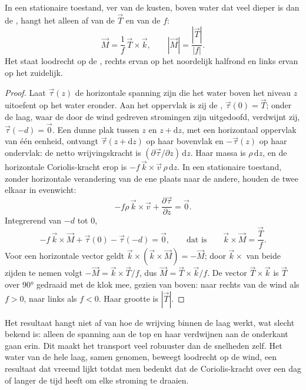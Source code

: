 \begin{theorem}[Ekmantransport]\label{thm:b1:ocean-circulation:ekman}
In een stationaire toestand, ver van de kusten, boven water dat veel dieper is dan de , hangt het  alleen af van de  $\vec T$ en van de  $f$:
\[
  \vec M = \frac{1}{f}\,\vec T\times\vec k,
  \qquad |\vec M| = \frac{|\vec T|}{|f|}.
\]
Het staat loodrecht op de , rechts ervan op het noordelijk halfrond en links ervan op het zuidelijk.
\end{theorem}

\begin{proof}
Laat $\vec\tau(z)$ de horizontale spanning zijn die het water boven het niveau $z$
uitoefent op het water eronder. Aan het oppervlak is zij de , $\vec\tau(0) =
\vec T$; onder de laag, waar de door de wind gedreven stromingen zijn uitgedoofd, verdwijnt zij,
$\vec\tau(-d) = \vec 0$. Een dunne plak tussen $z$ en $z + \mathrm dz$, met een horizontaal oppervlak van één eenheid, ontvangt
$\vec\tau(z + \mathrm dz)$ op haar bovenvlak en
$-\vec\tau(z)$ op haar ondervlak: de netto wrijvingskracht is $(\partial\vec
\tau/\partial z)\,\mathrm dz$. Haar massa is $\rho\,\mathrm dz$, en de horizontale
Coriolis-kracht erop is $-f\,\vec k\times\vec v\,\rho\,\mathrm dz$. In een stationaire
toestand, zonder horizontale verandering van de ene plaats naar de andere, houden de twee elkaar in evenwicht:
\[
  -f\rho\,\vec k\times\vec v + \frac{\partial\vec\tau}{\partial z} = \vec 0 .
\]
Integrerend van $-d$ tot $0$,
\[
  -f\,\vec k\times\vec M + \vec\tau(0) - \vec\tau(-d) = \vec 0,
  \qquad\text{dat is}\qquad \vec k\times\vec M = \frac{\vec T}{f}.
\]
Voor een horizontale vector geldt $\vec k\times(\vec k\times\vec M) = -\vec M$; door
$\vec k\times$ van beide zijden te nemen volgt $-\vec M = \vec k\times\vec T/f$, dus $\vec M =
\vec T\times\vec k/f$. De vector $\vec T\times\vec k$ is $\vec T$ over \ang{90} gedraaid
met de klok mee, gezien van boven: naar rechts van de wind als $f > 0$, naar links als $f < 0$.
Haar grootte is $|\vec T|$.
\end{proof}

Het resultaat hangt niet af van hoe de wrijving binnen de laag werkt, wat slecht bekend is: alleen de spanning aan de top en haar verdwijnen aan de onderkant gaan erin.
Dit maakt het transport veel robuuster dan de snelheden zelf. Het water van de hele laag, samen genomen, beweegt loodrecht op de wind, een resultaat dat vreemd lijkt totdat men bedenkt dat de Coriolis-kracht over een dag of langer de tijd heeft om elke stroming te draaien.

